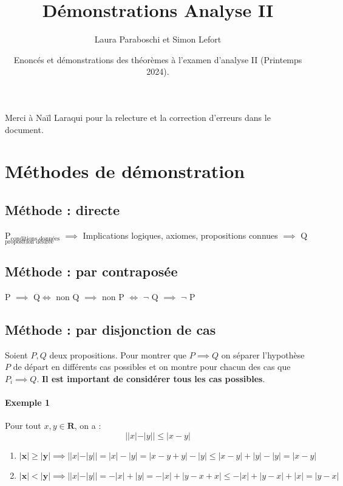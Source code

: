 \documentclass{article}
\title{Démonstrations Analyse II}
\author{Laura Paraboschi et Simon Lefort}
\date{Enoncés et démonstrations des théorèmes à l'examen d'analyse II (Printemps 2024).}
\begin{document}
\maketitle

Merci à Naïl Laraqui pour la relecture et la correction d'erreurs dans le document.

\tableofcontents

\newpage

\section{Méthodes de démonstration}

\subsection{Méthode : directe}
 P$_{\text{conditions données}}$ $\implies$ Implications logiques, axiomes, propositions connues $\implies$ Q$_{\text{proposition désirée}}$
\subsection{Méthode : par contraposée}
P $\implies$ Q\hspace{10mm}$\Leftrightarrow$\hspace{10mm} non Q $\implies$ non P \hspace{10mm}$\Leftrightarrow$\hspace{10mm} $\neg$ Q $\implies$ $\neg$ P
\subsection{Méthode : par disjonction de cas}

Soient $ P, Q $ deux propositions. Pour montrer que $ P \implies Q $ on séparer l'hypothèse $ P $ de départ en différents cas possibles et on montre pour chacun des cas que $ P_i \implies Q $. \textbf{Il est important de considérer tous les cas possibles}.

\paragraph{Exemple 1} Pour tout $ x, y \in \mathbf{R} $, on a :
\[ ||x| - |y|| \leq |x-y| \]
\begin{enumerate}
    \item $ \mathbf{|x| \geq |y|} \implies ||x| - |y|| = |x| - |y| = |x-y+y| - |y| \leq |x-y| + |y| - |y| = |x-y| $
    \item $ \mathbf{|x| < |y|} \implies ||x| - |y|| = -|x| + |y| = -|x| + |y-x+x| \leq -|x| + |y-x| + |x| = |y-x| $
\end{enumerate}
\end{document}
